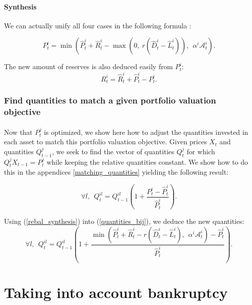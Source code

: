 \documentclass{article}
\newcommand{\wh}{\widehat}
\begin{document}
\paragraph{Synthesis}
We can actually unify all four cases in the following formula : 

\begin{equation}\label{rebal_synthesis}
P_t^i = \min(\widehat{P}_t^i + \widehat{R}_t^i - \max(0,~r(\wh D_t^i - \wh L_t^i)),~~\alpha^i \mathcal{A}_t^i).
\end{equation}

The new amount of reserves is also deduced easily from $P_t^i$: 
\begin{equation}\label{eq:rebal_reserves}
R_t^i = \widehat{R}_t^i + \widehat{P}_t^i - P_t^i.
\end{equation}

\subsubsection{Find quantities to match a given portfolio valuation objective}

\paragraph{}
Now that $P_t^{j}$ is optimized, we show here how to adjust the quantities invested in each asset to match this portfolio valuation objective. Given prices $X_t$ and quantities $Q_{t-1}^j$, we seek to find the vector of quantities $Q_t^{j}$ for which $Q_t^{j}X_{t-1} = P_t^{j}$ while keeping the relative quantities constant. We show how to do this in the appendices \ref{matching_quantities} yielding the following result: 

\begin{equation}\label{quantities_bij}
\forall l,~~ Q_t^{il} = Q_{t-1}^{il}\left(1 + \frac{P_t^i - \widehat{P}_t^i}{\widehat{P}_t^i} \right).
\end{equation}



Using (\ref{rebal_synthesis}) into (\ref{quantities_bij}), we deduce the new quantities:
\begin{equation}\label{eq:rebal_quantities}
\forall l,~~ Q_t^{il} = Q_{t-1}^{il}\left(1 + \frac{\min(\widehat{P}_t^i + \widehat{R}_t^i - r(\wh D_t^i - \wh L_t^i),~~\alpha^i \mathcal{A}_t^i) - \widehat{P}_t^i}{\widehat{P}_t^i} \right).
\end{equation}


\section{Taking into account bankruptcy}\label{dynamic with bankruptcy}
\end{document}
